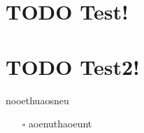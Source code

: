 \documentclass[11pt]{article}
\author{Houjun Liu}
\date{\today}
\title{}
\begin{document}
\tableofcontents

\section{{\bfseries\sffamily TODO} Test!}
\label{sec:org2485c26}

\section{{\bfseries\sffamily TODO} Test2!}
\label{sec:org8e43816}
nooethuaosneu

\begin{itemize}
\item[{$\square$}] aoenuthaoeunt
\end{itemize}
\end{document}
